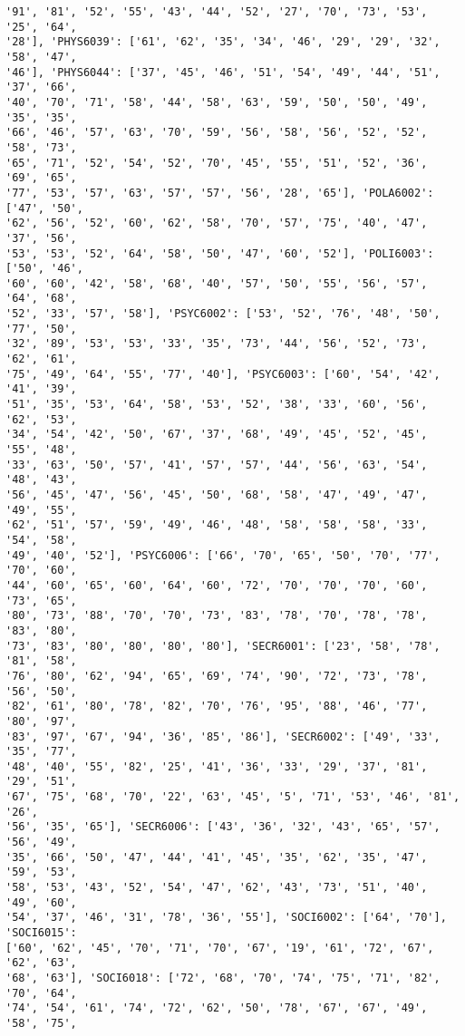 \documentclass[11pt]{article}
\begin{document}
\begin{Verbatim}[commandchars=\\\{\}]
'91', '81', '52', '55', '43', '44', '52', '27', '70', '73', '53', '25', '64',
'28'], 'PHYS6039': ['61', '62', '35', '34', '46', '29', '29', '32', '58', '47',
'46'], 'PHYS6044': ['37', '45', '46', '51', '54', '49', '44', '51', '37', '66',
'40', '70', '71', '58', '44', '58', '63', '59', '50', '50', '49', '35', '35',
'66', '46', '57', '63', '70', '59', '56', '58', '56', '52', '52', '58', '73',
'65', '71', '52', '54', '52', '70', '45', '55', '51', '52', '36', '69', '65',
'77', '53', '57', '63', '57', '57', '56', '28', '65'], 'POLA6002': ['47', '50',
'62', '56', '52', '60', '62', '58', '70', '57', '75', '40', '47', '37', '56',
'53', '53', '52', '64', '58', '50', '47', '60', '52'], 'POLI6003': ['50', '46',
'60', '60', '42', '58', '68', '40', '57', '50', '55', '56', '57', '64', '68',
'52', '33', '57', '58'], 'PSYC6002': ['53', '52', '76', '48', '50', '77', '50',
'32', '89', '53', '53', '33', '35', '73', '44', '56', '52', '73', '62', '61',
'75', '49', '64', '55', '77', '40'], 'PSYC6003': ['60', '54', '42', '41', '39',
'51', '35', '53', '64', '58', '53', '52', '38', '33', '60', '56', '62', '53',
'34', '54', '42', '50', '67', '37', '68', '49', '45', '52', '45', '55', '48',
'33', '63', '50', '57', '41', '57', '57', '44', '56', '63', '54', '48', '43',
'56', '45', '47', '56', '45', '50', '68', '58', '47', '49', '47', '49', '55',
'62', '51', '57', '59', '49', '46', '48', '58', '58', '58', '33', '54', '58',
'49', '40', '52'], 'PSYC6006': ['66', '70', '65', '50', '70', '77', '70', '60',
'44', '60', '65', '60', '64', '60', '72', '70', '70', '70', '60', '73', '65',
'80', '73', '88', '70', '70', '73', '83', '78', '70', '78', '78', '83', '80',
'73', '83', '80', '80', '80', '80'], 'SECR6001': ['23', '58', '78', '81', '58',
'76', '80', '62', '94', '65', '69', '74', '90', '72', '73', '78', '56', '50',
'82', '61', '80', '78', '82', '70', '76', '95', '88', '46', '77', '80', '97',
'83', '97', '67', '94', '36', '85', '86'], 'SECR6002': ['49', '33', '35', '77',
'48', '40', '55', '82', '25', '41', '36', '33', '29', '37', '81', '29', '51',
'67', '75', '68', '70', '22', '63', '45', '5', '71', '53', '46', '81', '26',
'56', '35', '65'], 'SECR6006': ['43', '36', '32', '43', '65', '57', '56', '49',
'35', '66', '50', '47', '44', '41', '45', '35', '62', '35', '47', '59', '53',
'58', '53', '43', '52', '54', '47', '62', '43', '73', '51', '40', '49', '60',
'54', '37', '46', '31', '78', '36', '55'], 'SOCI6002': ['64', '70'], 'SOCI6015':
['60', '62', '45', '70', '71', '70', '67', '19', '61', '72', '67', '62', '63',
'68', '63'], 'SOCI6018': ['72', '68', '70', '74', '75', '71', '82', '70', '64',
'74', '54', '61', '74', '72', '62', '50', '78', '67', '67', '49', '58', '75',

\end{Verbatim}
\end{document}
